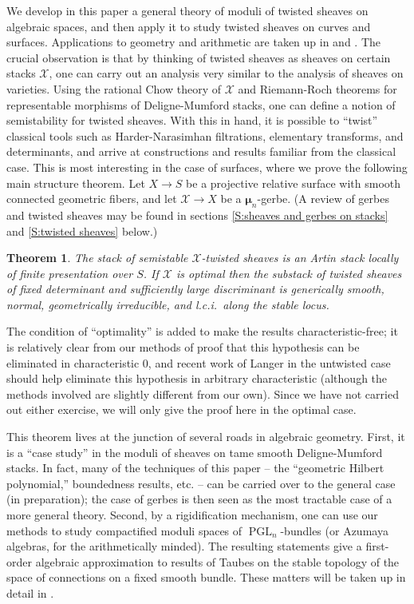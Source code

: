 \documentclass[11pt]{amsart}
\newcommand{\ms}[1]{\mathscr #1}
\newcommand{\m}{\boldsymbol{\mu}}
\newcommand{\PGL}{\operatorname{PGL}}
\renewcommand{\[}{[\!\hspace{0.03em}[}
\renewcommand{\]}{]\!\hspace{0.03em}]}
\renewcommand{\(}{(\!\hspace{0.03em}(}
\renewcommand{\)}{)\!\hspace{0.03em})}
\newtheorem*{theorem}{Theorem}
\theoremstyle{definition}
\theoremstyle{remark}
\begin{document}
We develop in this paper a general theory of moduli of twisted sheaves on algebraic spaces, and then apply it to study twisted sheaves on curves and surfaces.  Applications to geometry and arithmetic are taken up in \cite {pgl-bundles} and \cite {period-index-paper}.  The crucial observation is that by thinking of twisted sheaves as sheaves on certain stacks $\ms X$, one can carry out an analysis very similar to the analysis of sheaves on varieties.  Using the rational Chow theory of $\ms X$ and Riemann-Roch theorems for representable morphisms of Deligne-Mumford stacks, one can define a notion of semistability for twisted sheaves.  With this in hand, it is possible to ``twist'' classical tools such as Harder-Narasimhan filtrations, elementary transforms, and determinants, and arrive at constructions and results familiar from the classical case.  This is most interesting in the case of surfaces, where we prove the following main structure theorem.  Let $X \to S$ be a projective relative surface with smooth connected geometric fibers, and let $\ms X \to X$ be a $\m _ n$-gerbe.  (A review of gerbes and twisted sheaves may be found in sections \ref {S:sheaves and gerbes on stacks} and \ref{S:twisted sheaves} below.)

\begin{theorem}
The stack of semistable $\ms X$-twisted sheaves is an Artin stack locally of finite presentation over $S$.  If $\ms X$ is optimal then the substack of twisted sheaves of fixed determinant and sufficiently large discriminant is generically smooth, normal, geometrically irreducible, and l.c.i.\ along the stable locus.
\end{theorem}
The condition of ``optimality'' is added to make the results characteristic-free; it is relatively clear from our methods of proof that this hypothesis can be eliminated in characteristic 0, and recent work of Langer in the untwisted case should help eliminate this hypothesis in arbitrary characteristic (although the methods involved are slightly different from our own).  Since we have not carried out either exercise, we will only give the proof here in the optimal case.

This theorem lives at the junction of several roads in algebraic geometry.  First, it is a ``case study'' in the moduli of sheaves on tame smooth Deligne-Mumford stacks.  In fact, many of the techniques of this paper -- the ``geometric Hilbert polynomial,'' boundedness results, etc. -- can be carried over to the general case (in preparation); the case of gerbes is then seen as the most tractable case of a more general theory.  Second, by a rigidification mechanism, one can use our methods to study compactified moduli spaces of $\PGL _ n$-bundles (or Azumaya algebras, for the arithmetically minded).  The resulting statements give a first-order algebraic approximation to results of Taubes on the stable topology of the space of connections on a fixed smooth bundle.  These matters will be taken up in detail in \cite {pgl-bundles}.
\end{document}
